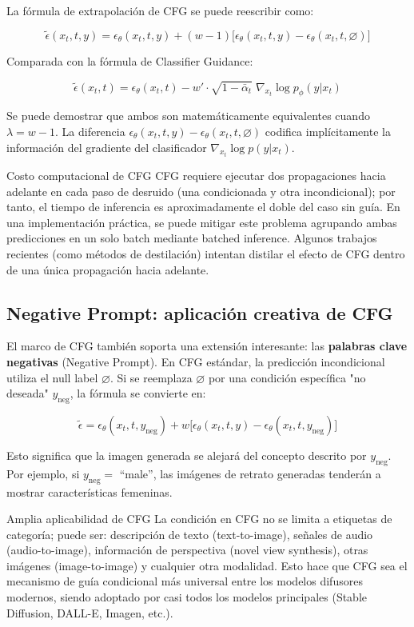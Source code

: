 La fórmula de extrapolación de CFG se puede reescribir como:

$$
\tilde{\epsilon}(x_t, t, y) = \epsilon_\theta(x_t, t, y) + (w-1)\bigl[\epsilon_\theta(x_t, t, y) - \epsilon_\theta(x_t, t, \varnothing)\bigr]
$$

Comparada con la fórmula de Classifier Guidance:

$$
\tilde{\epsilon}(x_t, t) = \epsilon_\theta(x_t, t) - w'\cdot\sqrt{1-\bar\alpha_t}\;\nabla_{x_t}\log p_\phi(y|x_t)
$$

Se puede demostrar que ambos son matemáticamente equivalentes cuando $\lambda = w - 1$. La diferencia $\epsilon_\theta(x_t, t, y) - \epsilon_\theta(x_t, t, \varnothing)$ codifica implícitamente la información del gradiente del clasificador $\nabla_{x_t}\log p(y|x_t)$.

\begin{warningbox}{Costo computacional de CFG}
CFG requiere ejecutar dos propagaciones hacia adelante en cada paso de desruido (una condicionada y otra incondicional); por tanto, el tiempo de inferencia es aproximadamente el doble del caso sin guía. En una implementación práctica, se puede mitigar este problema agrupando ambas predicciones en un solo batch mediante batched inference. Algunos trabajos recientes (como métodos de destilación) intentan distilar el efecto de CFG dentro de una única propagación hacia adelante.
\end{warningbox}

\subsection{Negative Prompt: aplicación creativa de CFG}

El marco de CFG también soporta una extensión interesante: las \textbf{palabras clave negativas} (Negative Prompt). En CFG estándar, la predicción incondicional utiliza el null label $\varnothing$. Si se reemplaza $\varnothing$ por una condición específica "no deseada" $y_{\text{neg}}$, la fórmula se convierte en:

$$
\tilde{\epsilon} = \epsilon_\theta(x_t, t, y_{\text{neg}}) + w\bigl[\epsilon_\theta(x_t, t, y) - \epsilon_\theta(x_t, t, y_{\text{neg}})\bigr]
$$

Esto significa que la imagen generada se alejará del concepto descrito por $y_{\text{neg}}$. Por ejemplo, si $y_{\text{neg}} =$ ``male'', las imágenes de retrato generadas tenderán a mostrar características femeninas.

\begin{knowledgebox}{Amplia aplicabilidad de CFG}
La condición en CFG no se limita a etiquetas de categoría; puede ser: descripción de texto (text-to-image), señales de audio (audio-to-image), información de perspectiva (novel view synthesis), otras imágenes (image-to-image) y cualquier otra modalidad. Esto hace que CFG sea el mecanismo de guía condicional más universal entre los modelos difusores modernos, siendo adoptado por casi todos los modelos principales (Stable Diffusion, DALL-E, Imagen, etc.).
\end{knowledgebox}

